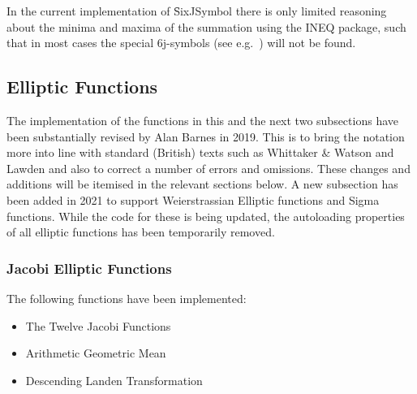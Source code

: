 In the current implementation of \f{SixJSymbol} there is only limited
reasoning about the minima and maxima of the summation using
the INEQ package, such that in most
cases the special 6j-symbols (see e.g.\ \cite{LandoltBoernstein:68})
will not be found.

\subsection{Elliptic Functions}
The implementation of the functions in this and the next two subsections have
been substantially revised by Alan Barnes in 2019. This is to bring the
notation more into line with standard (British) texts such as Whittaker
\& Watson \cite{WhittakerWatson:69} and Lawden \cite{Lawden:89} and also to correct
a number of errors and omissions. These changes and additions will be itemised in the relevant
sections below.  A new subsection has been added in 2021 to support  Weierstrassian Elliptic
functions and Sigma functions. While the code for these is being updated, the autoloading
properties of all elliptic functions has been temporarily removed.


\hypertarget{JACEF}{}
\subsubsection{Jacobi Elliptic  Functions}
The following functions have been implemented:
\begin{itemize}
\item The Twelve Jacobi Functions
\item Arithmetic Geometric Mean
\item Descending Landen Transformation
\end{itemize}

